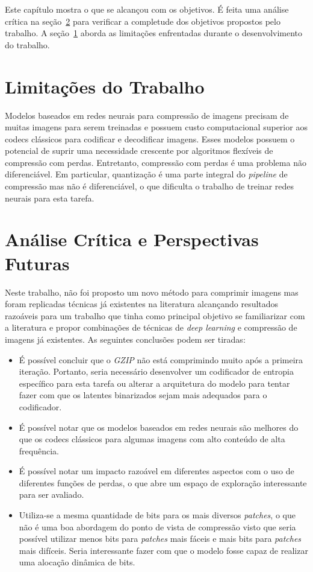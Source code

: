 Este capítulo mostra o que se alcançou com os objetivos. É feita uma análise crítica na seção~\ref{sec:analise} para verificar a completude dos objetivos propostos pelo trabalho. A seção~\ref{sec:limitacoes} aborda as limitações enfrentadas durante o desenvolvimento do trabalho.

\section{Limitações do Trabalho}
\label{sec:limitacoes}
Modelos baseados em redes neurais para compressão de imagens precisam de muitas imagens para serem treinadas e possuem custo computacional superior aos codecs clássicos para codificar e decodificar imagens. Esses modelos possuem o potencial de suprir uma necessidade crescente por algoritmos flexíveis de compressão com perdas. Entretanto, compressão com perdas é uma problema não diferenciável. Em particular, quantização é uma parte integral do \textit{pipeline} de compressão mas não é diferenciável, o que dificulta o trabalho de treinar redes neurais para esta tarefa.
\section{Análise Crítica e Perspectivas Futuras}
\label{sec:analise}
Neste trabalho, não foi proposto um novo método para comprimir imagens mas foram replicadas técnicas já existentes na literatura alcançando resultados razoáveis para um trabalho que tinha como principal objetivo se familiarizar com a literatura e propor combinações de técnicas de \textit{deep learning} e compressão de imagens já existentes. As seguintes conclusões podem ser tiradas:
\begin{itemize}
    \item É possível concluir que o \textit{GZIP} não está comprimindo muito após a primeira iteração. Portanto, seria necessário desenvolver um codificador de entropia específico para esta tarefa ou alterar a arquitetura do modelo para tentar fazer com que os latentes binarizados sejam mais adequados para o codificador.
    \item É possível notar que os modelos baseados em redes neurais são melhores do que os codecs clássicos para algumas imagens com alto conteúdo de alta frequência. 
    \item É possível notar um impacto razoável em diferentes aspectos com o uso de diferentes funções de perdas, o que abre um espaço de exploração interessante para ser avaliado.
    \item Utiliza-se a mesma quantidade de bits para os mais diversos \textit{patches}, o que não é uma boa abordagem do ponto de vista de compressão visto que seria possível utilizar menos bits para \textit{patches} mais fáceis e mais bits para \textit{patches} mais difíceis. Seria interessante fazer com que o modelo fosse capaz de realizar uma alocação dinâmica de bits.
\end{itemize}

